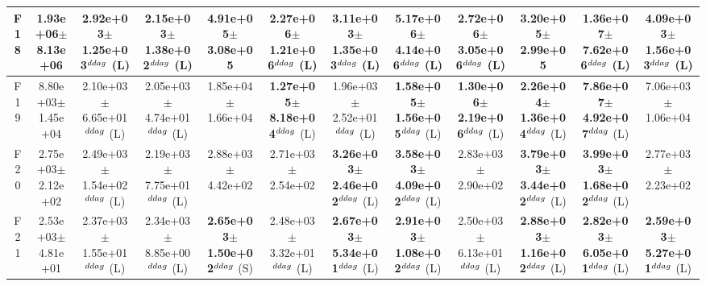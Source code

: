 \begin{table}[!t]
\begin{tabular}{c|ccccccccccc}
F18  & 1.93e+06$\pm$8.13e+06  & 2.92e+03$\pm$1.25e+03$^{\\ddag}$ (L)  & 2.15e+03$\pm$1.38e+02$^{\\ddag}$ (L)  & 4.91e+05$\pm$3.08e+05   & \textbf{2.27e+06$\pm$1.21e+06}$^{\\ddag}$ (L)  & 3.11e+03$\pm$1.35e+03$^{\\ddag}$ (L)  & \textbf{5.17e+06$\pm$4.14e+06}$^{\\ddag}$ (L)  & \textbf{2.72e+06$\pm$3.05e+06}$^{\\ddag}$ (L)  & 3.20e+05$\pm$2.99e+05   & \textbf{1.36e+07$\pm$7.62e+06}$^{\\ddag}$ (L)  & 4.09e+03$\pm$1.56e+03$^{\\ddag}$ (L) \\ \hline
F19  & 8.80e+03$\pm$1.45e+04  & 2.10e+03$\pm$6.65e+01$^{\\ddag}$ (L)  & 2.05e+03$\pm$4.74e+01$^{\\ddag}$ (L)  & 1.85e+04$\pm$1.66e+04   & \textbf{1.27e+05$\pm$8.18e+04}$^{\\ddag}$ (L)  & 1.96e+03$\pm$2.52e+01$^{\\ddag}$ (L)  & \textbf{1.58e+05$\pm$1.56e+05}$^{\\ddag}$ (L)  & \textbf{1.30e+06$\pm$2.19e+06}$^{\\ddag}$ (L)  & \textbf{2.26e+04$\pm$1.36e+04}$^{\\ddag}$ (L)  & \textbf{7.86e+07$\pm$4.92e+07}$^{\\ddag}$ (L)  & 7.06e+03$\pm$1.06e+04  \\ \hline
F20  & 2.75e+03$\pm$2.12e+02  & 2.49e+03$\pm$1.54e+02$^{\\ddag}$ (L)  & 2.19e+03$\pm$7.75e+01$^{\\ddag}$ (L)  & 2.88e+03$\pm$4.42e+02   & 2.71e+03$\pm$2.54e+02   & \textbf{3.26e+03$\pm$2.46e+02}$^{\\ddag}$ (L)  & \textbf{3.58e+03$\pm$4.09e+02}$^{\\ddag}$ (L)  & 2.83e+03$\pm$2.90e+02   & \textbf{3.79e+03$\pm$3.44e+02}$^{\\ddag}$ (L)  & \textbf{3.99e+03$\pm$1.68e+02}$^{\\ddag}$ (L)  & 2.77e+03$\pm$2.23e+02  \\ \hline
F21  & 2.53e+03$\pm$4.81e+01  & 2.37e+03$\pm$1.55e+01$^{\\ddag}$ (L)  & 2.34e+03$\pm$8.85e+00$^{\\ddag}$ (L)  & \textbf{2.65e+03$\pm$1.50e+02}$^{\\ddag}$ (S)  & 2.48e+03$\pm$3.32e+01$^{\\ddag}$ (L)  & \textbf{2.67e+03$\pm$5.34e+01}$^{\\ddag}$ (L)  & \textbf{2.91e+03$\pm$1.08e+02}$^{\\ddag}$ (L)  & 2.50e+03$\pm$6.13e+01$^{\\ddag}$ (L)  & \textbf{2.88e+03$\pm$1.16e+02}$^{\\ddag}$ (L)  & \textbf{2.82e+03$\pm$6.05e+01}$^{\\ddag}$ (L)  & \textbf{2.59e+03$\pm$5.27e+01}$^{\\ddag}$ (L) \\ \hline

\end{tabular}
\end{table}

